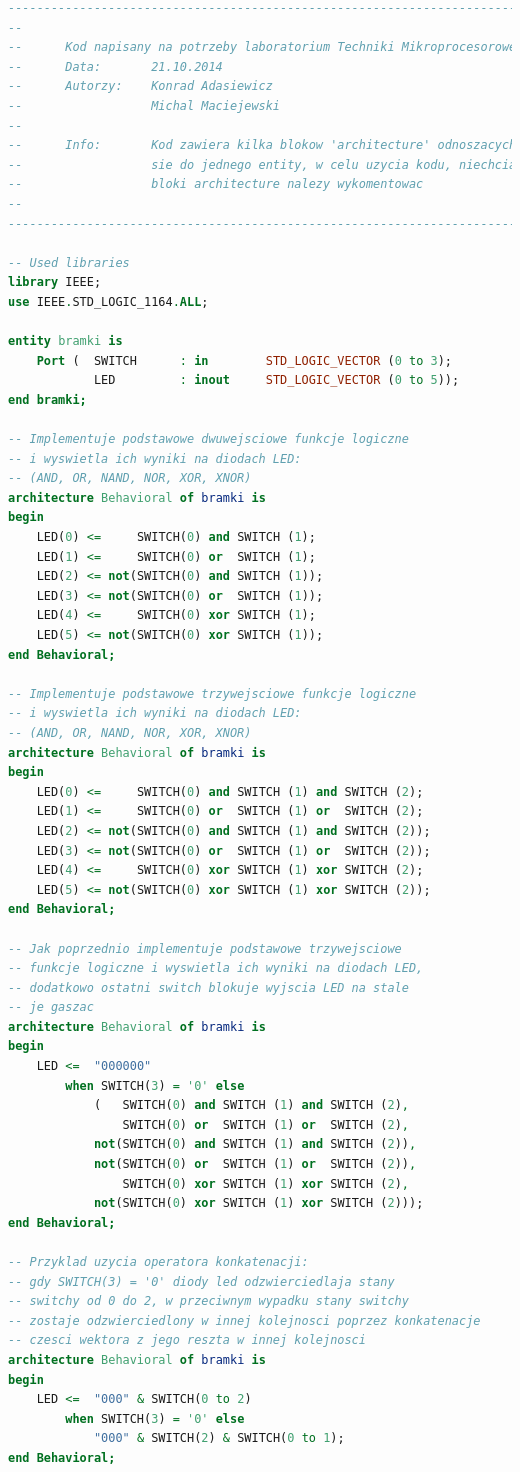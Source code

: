 \documentclass[12pt]{article}
\begin{document}
\begin{lstlisting}[language=VHDL, style=mystyle]
----------------------------------------------------------------------------------
--
--      Kod napisany na potrzeby laboratorium Techniki Mikroprocesorowej
--      Data:       21.10.2014
--      Autorzy:    Konrad Adasiewicz
--                  Michal Maciejewski
-- 
--      Info:       Kod zawiera kilka blokow 'architecture' odnoszacych 
--                  sie do jednego entity, w celu uzycia kodu, niechciane
--                  bloki architecture nalezy wykomentowac
--
----------------------------------------------------------------------------------

-- Used libraries
library IEEE;
use IEEE.STD_LOGIC_1164.ALL;

entity bramki is
    Port (  SWITCH      : in        STD_LOGIC_VECTOR (0 to 3);
            LED         : inout     STD_LOGIC_VECTOR (0 to 5));
end bramki;

-- Implementuje podstawowe dwuwejsciowe funkcje logiczne
-- i wyswietla ich wyniki na diodach LED:
-- (AND, OR, NAND, NOR, XOR, XNOR)
architecture Behavioral of bramki is
begin
    LED(0) <= 	  SWITCH(0) and SWITCH (1);
    LED(1) <= 	  SWITCH(0) or  SWITCH (1);
    LED(2) <= not(SWITCH(0) and SWITCH (1));
    LED(3) <= not(SWITCH(0) or  SWITCH (1));
    LED(4) <= 	  SWITCH(0) xor SWITCH (1);
    LED(5) <= not(SWITCH(0) xor SWITCH (1));
end Behavioral;

-- Implementuje podstawowe trzywejsciowe funkcje logiczne
-- i wyswietla ich wyniki na diodach LED:
-- (AND, OR, NAND, NOR, XOR, XNOR)
architecture Behavioral of bramki is
begin
    LED(0) <= 	  SWITCH(0) and SWITCH (1) and SWITCH (2);
    LED(1) <= 	  SWITCH(0) or  SWITCH (1) or  SWITCH (2);
    LED(2) <= not(SWITCH(0) and SWITCH (1) and SWITCH (2));
    LED(3) <= not(SWITCH(0) or  SWITCH (1) or  SWITCH (2));
    LED(4) <= 	  SWITCH(0) xor SWITCH (1) xor SWITCH (2);
    LED(5) <= not(SWITCH(0) xor SWITCH (1) xor SWITCH (2));
end Behavioral;

-- Jak poprzednio implementuje podstawowe trzywejsciowe
-- funkcje logiczne i wyswietla ich wyniki na diodach LED,
-- dodatkowo ostatni switch blokuje wyjscia LED na stale
-- je gaszac
architecture Behavioral of bramki is
begin
    LED <=  "000000"
        when SWITCH(3) = '0' else
            (   SWITCH(0) and SWITCH (1) and SWITCH (2),
                SWITCH(0) or  SWITCH (1) or  SWITCH (2),
            not(SWITCH(0) and SWITCH (1) and SWITCH (2)),
            not(SWITCH(0) or  SWITCH (1) or  SWITCH (2)),
                SWITCH(0) xor SWITCH (1) xor SWITCH (2),
            not(SWITCH(0) xor SWITCH (1) xor SWITCH (2)));
end Behavioral;

-- Przyklad uzycia operatora konkatenacji:
-- gdy SWITCH(3) = '0' diody led odzwierciedlaja stany 
-- switchy od 0 do 2, w przeciwnym wypadku stany switchy
-- zostaje odzwierciedlony w innej kolejnosci poprzez konkatenacje
-- czesci wektora z jego reszta w innej kolejnosci
architecture Behavioral of bramki is
begin
    LED <=  "000" & SWITCH(0 to 2)
        when SWITCH(3) = '0' else
            "000" & SWITCH(2) & SWITCH(0 to 1);
end Behavioral;
\end{lstlisting}
\end{document}
